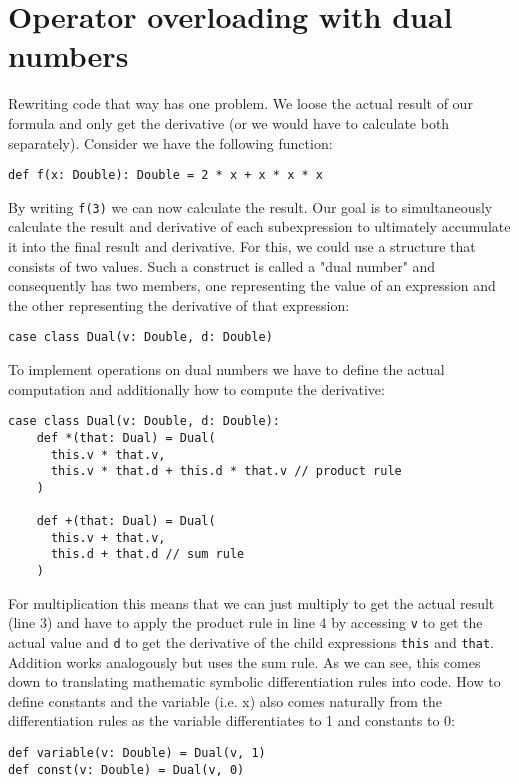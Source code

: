 \section{Operator overloading with dual numbers}\label{sec:forwardDualNumbers}

Rewriting code that way has one problem. We loose the actual result of our formula and only get the derivative (or we would have to calculate both separately). Consider we have the following function:
\begin{lstlisting}
def f(x: Double): Double = 2 * x + x * x * x
\end{lstlisting}
By writing \lstinline{f(3)} we can now calculate the result. Our goal is to simultaneously calculate the result and derivative of each subexpression to ultimately accumulate it into the final result and derivative. For this, we could use a structure that consists of two values. Such a construct is called a "dual number" and consequently has two members, one representing the value of an expression and the other representing the derivative of that expression:
\begin{lstlisting}
case class Dual(v: Double, d: Double)
\end{lstlisting}
To implement operations on dual numbers we have to define the actual computation and additionally how to compute the derivative:
\begin{lstlisting}[caption={Dual number implementation}, label={lst:forwardDualNumber}]
case class Dual(v: Double, d: Double):
    def *(that: Dual) = Dual(
      this.v * that.v,
      this.v * that.d + this.d * that.v // product rule
    )
  
    def +(that: Dual) = Dual(
      this.v + that.v,
      this.d + that.d // sum rule
    )
\end{lstlisting}
For multiplication this means that we can just multiply to get the actual result (line 3) and have to apply the product rule in line 4 by accessing \lstinline{v} to get the actual value and \lstinline{d} to get the derivative of the child expressions \lstinline{this} and \lstinline{that}. Addition works analogously but uses the sum rule.  As we can see, this comes down to translating mathematic symbolic differentiation rules into code. How to define constants and the variable (i.e. x) also comes naturally from the differentiation rules as the variable differentiates to 1 and constants to 0:
\begin{lstlisting}
def variable(v: Double) = Dual(v, 1)
def const(v: Double) = Dual(v, 0)
\end{lstlisting}
